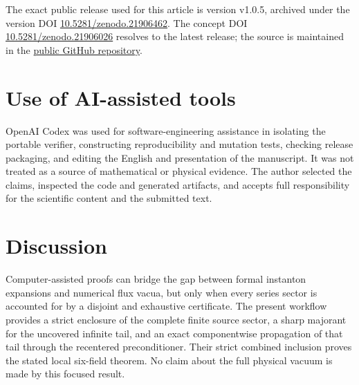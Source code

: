 \documentclass[11pt]{article}
\begin{document}
The exact public release used for this article is version v1.0.5, archived
under the version DOI
\href{https://doi.org/10.5281/zenodo.21906462}{10.5281/zenodo.21906462}.
The concept DOI
\href{https://doi.org/10.5281/zenodo.21906026}{10.5281/zenodo.21906026}
resolves to the latest release; the source is maintained in the
\href{https://github.com/megazord78-pixel/interval-flux-vacuum-5-81}
{public GitHub repository}.

\section*{Use of AI-assisted tools}

OpenAI Codex was used for software-engineering assistance in isolating the
portable verifier, constructing reproducibility and mutation tests, checking
release packaging, and editing the English and presentation of the
manuscript.  It was not treated as a source of mathematical or physical
evidence.  The author selected the claims, inspected the code and generated
artifacts, and accepts full responsibility for the scientific content and the
submitted text.

\section{Discussion}

Computer-assisted proofs can bridge the gap between formal instanton
expansions and numerical flux vacua, but only when every series sector is
accounted for by a disjoint and exhaustive certificate.  The present workflow
provides a strict enclosure of the complete finite source sector, a sharp
majorant for the uncovered infinite tail, and an exact componentwise
propagation of that tail through the recentered preconditioner.  Their strict
combined inclusion proves the stated local six-field theorem.  No claim about
the full physical vacuum is made by this focused result.



\end{document}
